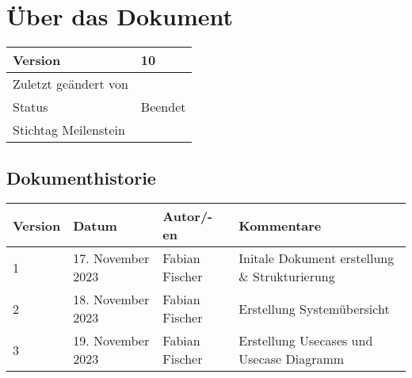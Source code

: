 \section{Über das Dokument}

\begin{table}[H]
  \begin{tabular}{|l|l|}
    \hline
   Version & 10 \\ \hline
   Zuletzt geändert von & \date{\today} \\ \hline
   Status & Beendet \\ \hline
   Stichtag Meilenstein &  \\ \hline
  \end{tabular}
\end{table}

\subsection{Dokumenthistorie}

\begin{table}[H]
  \begin{tabular}{|l|l|l|l|}
    \hline
   Version & Datum & Autor/-en & Kommentare \\ \hline
   1 & 17. November 2023 & Fabian Fischer & Initale Dokument erstellung \& Strukturierung \\ \hline
   2 & 18. November 2023 & Fabian Fischer & Erstellung Systemübersicht \\ \hline
    3 & 19. November 2023 & Fabian Fischer & Erstellung Usecases und Usecase Diagramm \\ \hline
  \end{tabular}
\end{table}

